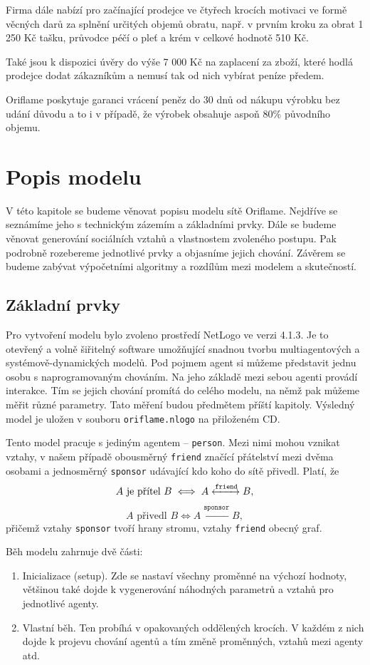\documentclass[a4wide,12pt]{report}
\begin{document}
Firma dále nabízí pro začínající prodejce ve čtyřech krocích motivaci ve formě věcných darů za splnění určitých objemů obratu, např. v prvním kroku za obrat 1 250 Kč tašku, průvodce péčí o pleť a krém v celkové hodnotě 510 Kč.

Také jsou k dispozici úvěry do výše 7 000 Kč na zaplacení za zboží, které hodlá prodejce dodat zákazníkům a nemusí tak od nich vybírat peníze předem.

Oriflame poskytuje garanci vrácení peněz do 30 dnů od nákupu výrobku bez udání důvodu a to i v případě, že výrobek obsahuje aspoň 80\% původního objemu.



\chapter{Popis modelu}
V této kapitole se budeme věnovat popisu modelu sítě Oriflame. Nejdříve se seznámíme jeho s technickým zázemím a základními prvky. Dále se budeme věnovat generování sociálních vztahů a vlastnostem zvoleného postupu. Pak podrobně rozebereme jednotlivé prvky a objasníme jejich chování. Závěrem se budeme zabývat výpočetními algoritmy a rozdílům mezi modelem a skutečností.
\section{Základní prvky}
Pro vytvoření modelu bylo zvoleno prostředí NetLogo\cite{netlogo} ve verzi 4.1.3. Je to otevřený a volně šiřitelný software umožňující snadnou tvorbu multiagentových a systémově-dynamických modelů. Pod pojmem agent si můžeme představit jednu osobu s naprogramovaným chováním. Na jeho základě mezi sebou agenti provádí interakce. Tím se jejich chování promítá do celého modelu, na němž pak můžeme měřit různé parametry. Tato měření budou předmětem příští kapitoly. Výsledný model je uložen v souboru \texttt{oriflame.nlogo} na přiloženém CD.

Tento model pracuje s jediným agentem -- \texttt{person}. Mezi nimi mohou vznikat vztahy, v našem případě obousměrný \texttt{friend} značící přátelství mezi dvěma osobami a jednosměrný \texttt{sponsor} udávající kdo koho do sítě přivedl. Platí, že
\[ A \text{ je přítel } B \iff A \xleftrightarrow{\texttt{friend}} B,\]
\[ A \text{ přivedl } B \iff A \xleftarrow{\texttt{sponsor}} B,\]
přičemž vztahy \texttt{sponsor} tvoří hrany stromu, vztahy \texttt{friend} obecný graf.

Běh modelu zahrnuje dvě části:
\begin{enumerate}
\item Inicializace (setup). Zde se nastaví všechny proměnné na výchozí hodnoty, většinou také dojde k vygenerování náhodných parametrů a vztahů pro jednotlivé agenty.
\item Vlastní běh. Ten probíhá v opakovaných oddělených krocích. V každém z nich dojde k projevu chování agentů a tím změně proměnných, vztahů mezi agenty atd.
\end{enumerate}
\end{document}
